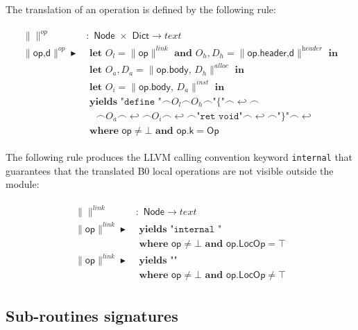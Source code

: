 \documentclass{article}
\newcommand{\trad}[2]{\ensuremath{\lVert \textsf{#1} \rVert^{\textit{#2}}}}
\newcommand{\nl}[0]{\ensuremath{\hookleftarrow}}
\DeclareMathOperator{\conc}{\smallfrown}
\DeclareMathOperator{\isdef}{\blacktriangleright}
\begin{document}
The translation of an operation is defined by the following rule:
\begin{framed}
\begin{align}
\begin{split}
  \trad{}{op} &: \textsf{ Node } \times \textsf{ Dict} \rightarrow text \\
  \trad{op,d}{op} \isdef
  & \textbf{ let } O_l = \trad{op}{link} \textbf{ and } O_h, D_h = \trad{op.header,d}{header} \textbf{ in}  \\
  & \textbf{ let } O_a, D_a = \trad{op.body, $D_h$}{alloc} \textbf{ in}  \\
  & \textbf{ let } O_i = \trad{op.body, $D_a$}{inst} \textbf{ in}  \\
  & \textbf{ yields } \texttt{"define "} \conc O_l \conc O_h \conc \texttt{"\{"} \conc \nl \conc \\
  & \quad \conc O_a \conc \nl \conc O_i \conc \nl \conc \texttt{"ret void"} \conc \nl \conc \texttt{"\}"} \conc \nl  \\
  & \textbf{ where } \textsf{op} \ne \bot \textbf{ and } \textsf{op.k} = \textsf{Op} 
\end{split}
\end{align}
\end{framed}

The following rule produces the LLVM calling convention keyword
\texttt{internal} that guarantees that the translated B0 local
operations are not visible outside the module:
\begin{framed}
\begin{align}
\begin{split}
  \trad{}{link} &: \textsf{ Node} \rightarrow text \\
  \trad{op}{link} \isdef
  & \textbf{ yields } \texttt{"internal "} \\
  & \textbf{ where } \textsf{op} \ne \bot \textbf{ and } \textsf{op.LocOp} = \top \\
  \trad{op}{link} \isdef
  & \textbf{ yields } \texttt{""} \\
  & \textbf{ where } \textsf{op} \ne \bot \textbf{ and } \textsf{op.LocOp} \ne \top
\end{split}
\end{align}
\end{framed}

\subsection{Sub-routines signatures}
\label{sec:trad-header}
\end{document}
